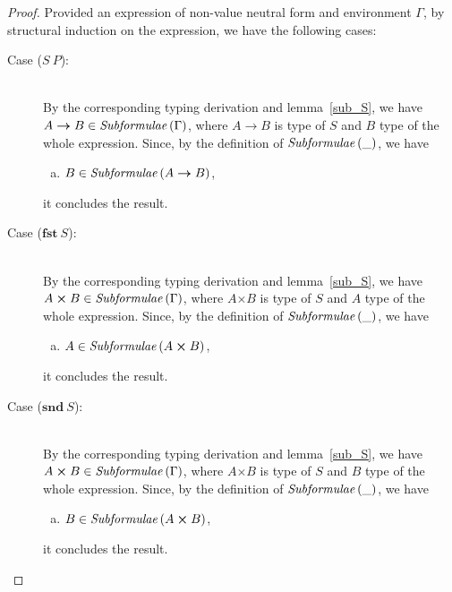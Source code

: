 \documentclass[a4paper]{article}
\newcommand{\typarr}[2]{#1\boldsymbol{\rightarrow}#2}
\newcommand{\typprd}[2]{#1\boldsymbol{\times}#2}
\newcommand{\expapp}[2]{#1\ #2}
\newcommand{\expfst}[1]{\mathbf{fst}\ #1}
\newcommand{\expsnd}[1]{\mathbf{snd}\ #1}
\newcommand{\txt}[1]{\text{\textit{#1}}}
\newcommand{\subformulae}[1]{\txt{Subformulae}\,(#1)}
\begin{document}
\begin{proof}
Provided an expression of non-value neutral form and environment
$\Gamma$, by structural induction on the expression, we have the following cases:
\begin{description}
\item[Case ($\expapp{S}{P}$):]\ \\ 
  By the corresponding typing derivation and lemma~\ref{sub_S}, we
  have $\typarr{A}{B} \in \subformulae{\Gamma}$, where $\typarr{A}{B}$
  is type of $S$ and $B$ type of the whole expression. Since, by the
  definition of $\subformulae{\_}$, we have
  \begin{enumerate}[(a)] 
  \item  $B \in \subformulae{\typarr{A}{B}}$,
  \end{enumerate}
  it concludes the result.
\item[Case ($\expfst{S}$):]\ \\
  By the corresponding typing derivation and lemma~\ref{sub_S}, we
  have $\typprd{A}{B} \in \subformulae{\Gamma}$, where $\typprd{A}{B}$
  is type of $S$ and $A$ type of the whole expression. Since, by the
  definition of $\subformulae{\_}$, we have
  \begin{enumerate}[(a)] 
  \item $A \in \subformulae{\typprd{A}{B}}$,
  \end{enumerate}
  it concludes the result.
\item[Case ($\expsnd{S}$):]\ \\
  By the corresponding typing derivation and lemma~\ref{sub_S}, we
  have $\typprd{A}{B} \in \subformulae{\Gamma}$, where $\typprd{A}{B}$
  is type of $S$ and $B$ type of the whole expression. Since, by the
  definition of $\subformulae{\_}$, we have
  \begin{enumerate}[(a)] 
  \item $B \in \subformulae{\typprd{A}{B}}$,
  \end{enumerate}
  it concludes the result.
\end{description}
\end{proof}
\end{document}
